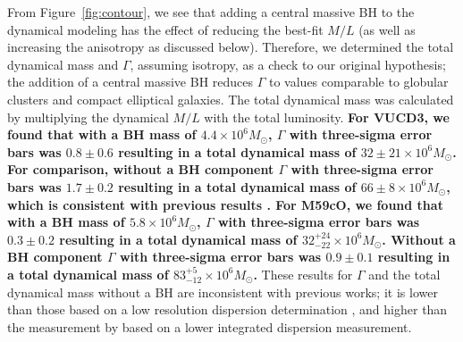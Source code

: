 \documentclass{aastex}
\begin{document}
From Figure~\ref{fig:contour}, we see that adding a central massive BH to the dynamical modeling has the effect of reducing the best-fit $M/L$ (as well as increasing the anisotropy as discussed below). Therefore, we determined the total dynamical mass and $\Gamma$, assuming isotropy, as a check to our original hypothesis; the addition of a central massive BH reduces $\Gamma$ to values comparable to globular clusters and compact elliptical galaxies. The total dynamical mass was calculated by multiplying the dynamical $M/L$ with the total luminosity. \textbf{For VUCD3, we found that with a BH mass of $4.4 \times 10^6 M_\odot$, $\Gamma$ with three-sigma error bars was $0.8 \pm 0.6$ resulting in a total dynamical mass of $32 \pm 21 \times 10^6 M_\odot$. For comparison, without a BH component $\Gamma$ with three-sigma error bars was $1.7 \pm 0.2$ resulting in a total dynamical mass of $66 \pm 8 \times10^6 M_\odot$, which is consistent with previous results \citep{evstigneeva07,mieske13}. For M59cO, we found that with a BH mass of $5.8 \times 10^6 M_\odot$, $\Gamma$ with three-sigma error bars was $0.3 \pm 0.2$ resulting in a total dynamical mass of $32^{+24}_{-22}  \times 10^6 M_\odot$. Without a BH component $\Gamma$ with three-sigma error bars was $0.9 \pm 0.1$ resulting in a total dynamical mass of $83^{+5}_{-12} \times 10^6 M_\odot$. }These results for $\Gamma$ and the total dynamical mass without a BH are inconsistent with previous works; it is lower than those based on a low resolution dispersion determination \citep{chilingarianmamon08,mieske13}, and higher than the measurement by \citet{forbes14} based on a lower integrated dispersion measurement.
\end{document}
